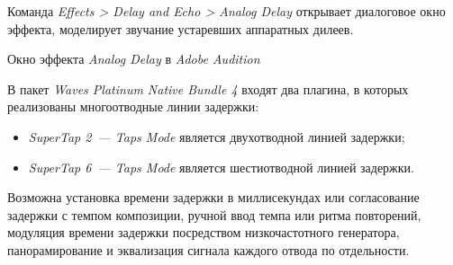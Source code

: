 \documentclass{beamer}
\begin{document}
\begin{frame}
  Команда \emph{Effects > Delay and Echo > Analog Delay} открывает диалоговое окно эффекта, моделирует звучание устаревших аппаратных дилеев.

  \begin{block}{Окно эффекта \emph{Analog Delay} в \emph{Adobe Audition}}
  \end{block}
\end{frame}

\begin{frame}
  В пакет \emph{Waves Platinum Native Bundle 4} входят два плагина, в которых реализованы многоотводные линии задержки:
  \begin{itemize}
    \item \emph{SuperTap 2~--- Taps Mode} является двухотводной линией задержки;
    \item \emph{SuperTap 6~--- Taps Mode} является шестиотводной линией задержки.
  \end{itemize}

  Возможна установка времени задержки в миллисекундах или согласование задержки с темпом композиции, ручной ввод темпа или ритма повторений, модуляция времени задержки посредством низкочастотного генератора, панорамирование и эквализация сигнала каждого отвода по отдельности.

  
\end{frame}
\end{document}
